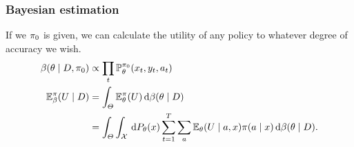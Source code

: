 \begin{frame}
  \frametitle{Bayesian estimation}
  If we $\pi_0$ is given, we can calculate the utility of any policy to whatever degree of accuracy we wish. 
  \begin{align*}
    \beta(\theta \mid D, \pi_0) &\propto \prod_t \mathop{\mbox{\ensuremath{\mathbb{P}}}}\nolimits^{\pi_0}_\theta(x_t, y_t, a_t)\\
    \mathop{\mbox{\ensuremath{\mathbb{E}}}}\nolimits_\beta^\pi(U \mid D) &= \int_\Theta \mathop{\mbox{\ensuremath{\mathbb{E}}}}\nolimits_\theta^\pi(U) \,\mathrm{d} \beta(\theta \mid D)\\
                                &= \int_\Theta 
                                  \int_{\mathcal{X}} \,\mathrm{d} P_\theta(x)
                                  \sum_{t=1}^T
                                  \sum_a
                                  \mathop{\mbox{\ensuremath{\mathbb{E}}}}\nolimits_\theta(U \mid a, x)
                                  \pi(a \mid x)
                                  \,\mathrm{d} \beta(\theta \mid D).
  \end{align*}
\end{frame}


